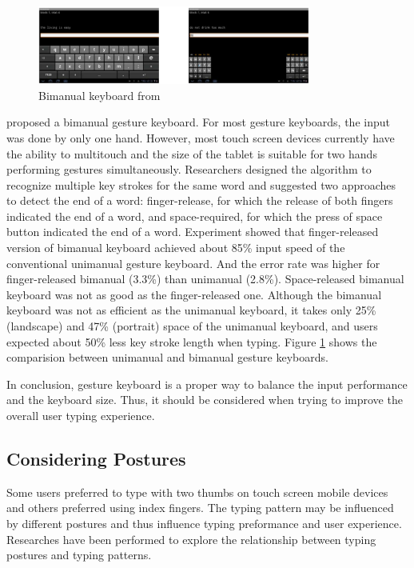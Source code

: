 \documentclass[11pt]{article}
\begin{document}
\begin{figure}[H]
  \centering
  \includegraphics[width=0.8\textwidth]{Bimanual.png}
  \caption{Bimanual keyboard from \citep{10.1145/2380116.2380136}}
  \label{fig:bimanual}
\end{figure}

\citet{10.1145/2380116.2380136} proposed a bimanual gesture keyboard. For most gesture keyboards, the input was done by only one hand. However, most touch screen devices currently have the ability to multitouch and the size of the tablet is suitable for two hands performing gestures simultaneously. Researchers designed the algorithm to recognize multiple key strokes for the same word and suggested two approaches to detect the end of a word: finger-release, for which the release of both fingers indicated the end of a word, and space-required, for which the press of space button indicated the end of a word. Experiment showed that finger-released version of bimanual keyboard achieved about 85\% input speed of the conventional unimanual gesture keyboard. And the error rate was higher for finger-released bimanual (3.3\%) than unimanual (2.8\%). Space-released bimanual keyboard was not as good as the finger-released one. Although the bimanual keyboard was not as efficient as the unimanual keyboard, it takes only 25\% (landscape) and 47\% (portrait) space of the unimanual keyboard, and users expected about 50\% less key stroke length when typing. Figure \ref{fig:bimanual} shows the comparision between unimanual and bimanual gesture keyboards.

In conclusion, gesture keyboard is a proper way to balance the input performance and the keyboard size. Thus, it should be considered when trying to improve the overall user typing experience.

\subsection{Considering Postures}
Some users preferred to type with two thumbs on touch screen mobile devices and others preferred using index fingers. The typing pattern may be influenced by different postures and thus influence typing preformance and user experience. Researches have been performed to explore the relationship between typing postures and typing patterns.
\end{document}
